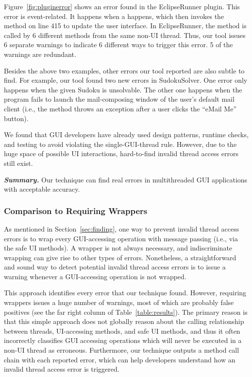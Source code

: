 Figure~\ref{fig:pluginerror} shows an error found in the EclipseRunner
plugin. This error is event-related. It happens when a 
 happens, which then invokes the 
method on line 415 to update the user interface. In EclipseRunner,
the  method is
called by 6 different methods from the same non-UI thread. Thus, our
tool issues 6 separate warnings to indicate
6 different ways to trigger this error. 5 of the warnings are redundant.

Besides the above two examples, other errors our tool reported are also
subtle to find. For example, our tool found two new errors in SudokuSolver.
One error only happens when
the given Sudoku is unsolvable.  The other one happens
when the program fails to launch the mail-composing window of the
user's default mail client (i.e., the 
method throws an exception after a user clicks the ``eMail Me'' button).

\enlargethispage{5pt}

We found that GUI developers have already
used design patterns, runtime checks, and testing to avoid violating
the single-GUI-thread rule. However, due to the huge space of
possible UI interactions, hard-to-find
invalid thread access errors still exist.

\vspace{1mm}

\noindent \textbf{\textit{Summary.}} Our technique can find real errors
in multithreaded GUI applications with
acceptable accuracy.


\subsubsection{Comparison to Requiring Wrappers}
\label{sec:straightforward}

As mentioned in Section~\ref{sec:finding}, one way to prevent
invalid thread access errors is to wrap every GUI-accessing operation
with message passing (i.e., via the safe UI methods).  A wrapper is not
always necessary, and indiscriminate wrapping
can give rise to other types of errors.  Nonetheless, a
straightforward and sound way to detect potential invalid thread access errors
is to issue a warning whenever a GUI-accessing operation
is not wrapped. 

This approach identifies every
error that our technique found.
However, requiring wrappers 
issues a huge number of warnings,
most of which are probably false positives (see the far right column of
Table~\ref{table:results}).
The primary reason is that this simple approach
does not globally reason about the calling relationship between
threads, UI-accessing methods, and safe UI methods, and thus it often incorrectly
classifies GUI accessing operations which will never be executed
in a non-UI thread as erroneous. Furthermore, our technique
outputs a method call chain with each reported error, which can help
developers understand how an invalid thread access error is triggered.



